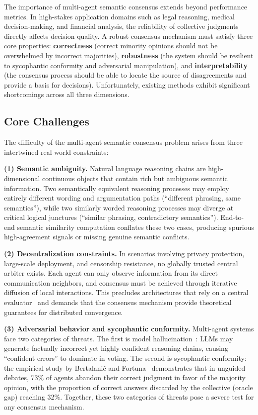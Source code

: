 \documentclass[12pt,a4paper]{article}
\begin{document}
The importance of multi-agent semantic consensus extends beyond performance metrics. In high-stakes application domains such as legal reasoning, medical decision-making, and financial analysis, the reliability of collective judgments directly affects decision quality. A robust consensus mechanism must satisfy three core properties: \textbf{correctness} (correct minority opinions should not be overwhelmed by incorrect majorities), \textbf{robustness} (the system should be resilient to sycophantic conformity and adversarial manipulation), and \textbf{interpretability} (the consensus process should be able to locate the source of disagreements and provide a basis for decisions). Unfortunately, existing methods exhibit significant shortcomings across all three dimensions.

\subsection{Core Challenges}

The difficulty of the multi-agent semantic consensus problem arises from three intertwined real-world constraints:

\textbf{(1) Semantic ambiguity.} Natural language reasoning chains are high-dimensional continuous objects that contain rich but ambiguous semantic information. Two semantically equivalent reasoning processes may employ entirely different wording and argumentation paths (``different phrasing, same semantics''), while two similarly worded reasoning processes may diverge at critical logical junctures (``similar phrasing, contradictory semantics''). End-to-end semantic similarity computation conflates these two cases, producing spurious high-agreement signals or missing genuine semantic conflicts.

\textbf{(2) Decentralization constraints.} In scenarios involving privacy protection, large-scale deployment, and censorship resistance, no globally trusted central arbiter exists. Each agent can only observe information from its direct communication neighbors, and consensus must be achieved through iterative diffusion of local interactions. This precludes architectures that rely on a central evaluator~\cite{chen2023agentverse} and demands that the consensus mechanism provide theoretical guarantees for distributed convergence.

\textbf{(3) Adversarial behavior and sycophantic conformity.} Multi-agent systems face two categories of threats. The first is model hallucination~\cite{ji2023hallucination}: LLMs may generate factually incorrect yet highly confident reasoning chains, causing ``confident errors'' to dominate in voting. The second is sycophantic conformity: the empirical study by Bertalani\v{c} and Fortuna~\cite{bertalanic2026cost} demonstrates that in unguided debates, 73\% of agents abandon their correct judgment in favor of the majority opinion, with the proportion of correct answers discarded by the collective (oracle gap) reaching 32\%. Together, these two categories of threats pose a severe test for any consensus mechanism.
\end{document}
